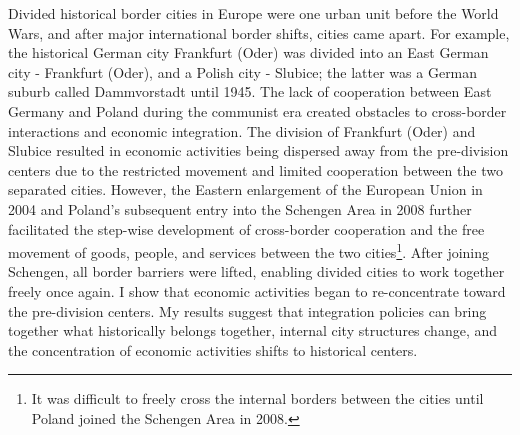 \documentclass[12pt]{article}    %
\begin{document}
\par Divided historical border cities in Europe were one urban unit before the World Wars, and after major international border shifts, cities came apart. For example, the historical German city Frankfurt (Oder) was divided into an East German city - Frankfurt (Oder), and a Polish city - Slubice; the latter was a German suburb called Dammvorstadt until 1945. The lack of cooperation between East Germany and Poland during the communist era created obstacles to cross-border interactions and economic integration. The division of Frankfurt (Oder) and Slubice resulted in economic activities being dispersed away from the pre-division centers due to the restricted movement and limited cooperation between the two separated cities. However, the Eastern enlargement of the European Union in 2004 and Poland's subsequent entry into the Schengen Area in 2008 further facilitated the step-wise development of cross-border cooperation and the free movement of goods, people, and services between the two cities\footnote{It was difficult to freely cross the internal borders between the cities until Poland joined the Schengen Area in  2008.}. After joining Schengen, all border barriers were lifted, enabling divided cities to work together freely once again. I show that economic activities began to re-concentrate toward the pre-division centers. My results suggest that integration policies can bring together what historically belongs together, internal city structures change, and the concentration of economic activities shifts to historical centers. 
\end{document}
